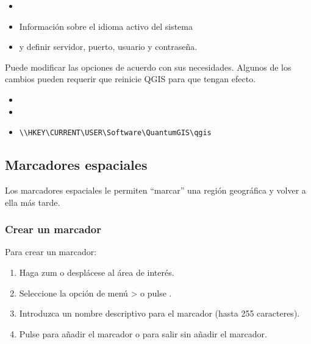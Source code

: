 
\begin{itemize}
\item {}
\item Información sobre el idioma activo del sistema
\end{itemize}


\begin{itemize}
\item {} y definir servidor, puerto, usuario y
contraseña.
\end{itemize}

Puede modificar las opciones de acuerdo con sus necesidades. Algunos de los cambios pueden requerir que reinicie QGIS para que tengan efecto.

\begin{itemize}
\item {}
\item {}
\item {}
\begin{verbatim}
\\HKEY\CURRENT\USER\Software\QuantumGIS\qgis
\end{verbatim}
\end{itemize}


\subsection{Marcadores espaciales}\label{sec:bookmarks}

Los marcadores espaciales le permiten ``marcar'' una región geográfica y volver a ella
más tarde.

\subsubsection{Crear un marcador}
Para crear un marcador:
\begin{enumerate}
\item Haga zum o desplácese al área de interés.
\item Seleccione la opción de menú  >  o pulse .
\item Introduzca un nombre descriptivo para el marcador (hasta 255 caracteres).
\item Pulse  para añadir el marcador o  para salir sin añadir el marcador.
\end{enumerate}

